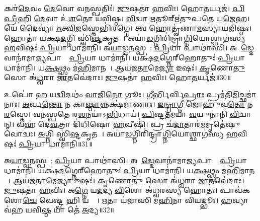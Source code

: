 𑌕𑌰॑\ul{𑌦𑍇}𑌵𑌂 \ul{𑌦𑍇}𑌵𑍋 𑌵\ul{𑌨}𑌸𑍍𑌪𑌤𑌿𑌃॑।
\ul{𑌜𑍁}𑌷𑌤𑌾॑ \ul{𑌹}𑌵𑌿𑌃।
𑌹𑍋\ul{𑌤}𑌰𑍍𑌯𑌜॑।
\ul{𑌪𑌿}\ul{𑌪𑍍𑌰𑍀}𑌹𑌿 \ul{𑌦𑍇}𑌵𑌾 𑌉॑\ul{𑌶}𑌤𑍋 𑌯॑𑌵𑌿𑌷𑍍𑌠।
\ul{𑌵𑌿}𑌦𑍍𑌵𑌾 \ul{𑌋}𑌤𑍂𑌰𑍍\mbox{}𑌋॑𑌤𑍁𑌪𑌤𑍇 𑌯\ul{𑌜𑍇}𑌹।
𑌯𑍇 𑌦𑍈𑌵𑍍𑌯𑌾॑ \ul{𑌋}𑌤𑍍𑌵𑌿\ul{𑌜}𑌸𑍍𑌤𑍇𑌭𑌿॑𑌰𑌗𑍍𑌨𑍇।
𑌤𑍍𑌵 𑌹𑍋𑌤𑍄॑𑌣𑌾\ul{𑌮}𑌸𑍍𑌯𑌾𑌯॑𑌜𑌿𑌷𑍍𑌠𑌃।
𑌹𑍋𑌤𑌾॑ 𑌯𑌕𑍍𑌷\ul{𑌦}𑌗𑍍𑌨𑌿 𑌸𑍍𑌵𑌿॑\ul{𑌷𑍍𑌟}𑌕𑍃𑌤𑌮𑍍᳚।
𑌅𑌯𑌾॑\ul{𑌡}𑌗𑍍𑌨𑌿𑌰𑌿॑𑌨𑍍𑌦𑍍𑌰𑌾\ul{𑌗𑍍𑌨𑌿}𑌯𑍋𑌶𑍍𑌛𑌾𑌗॑𑌸𑍍𑌯 \ul{𑌹}𑌵𑌿𑌷𑌃॑ \ul{𑌪𑍍𑌰𑌿}𑌯𑌾 𑌧𑌾𑌮𑌾॑𑌨𑌿।
𑌅\ul{𑌯𑌾}𑌡𑍍𑌵\ul{𑌨}𑌸𑍍𑌪𑌤𑍇᳚: \ul{𑌪𑍍𑌰𑌿}𑌯𑌾 𑌪𑌾𑌥𑌾॑𑌸𑌿।
𑌅𑌯𑌾᳚\ul{𑌡𑍍𑌦𑍇}𑌵𑌾𑌨𑌾॑𑌮𑌾\ul{𑌜𑍍𑌯}𑌪𑌾𑌨𑌾𑌂᳚ \ul{𑌪𑍍𑌰𑌿}𑌯𑌾 𑌧𑌾𑌮𑌾॑𑌨𑌿।
𑌯𑌕𑍍𑌷॑\ul{𑌦}𑌗𑍍𑌨𑍇𑌰𑍍‌\mbox{}𑌹𑍋𑌤𑍁𑌃॑ \ul{𑌪𑍍𑌰𑌿}𑌯𑌾 𑌧𑌾𑌮𑌾॑𑌨𑌿।
𑌯\ul{𑌕𑍍𑌷}𑌥𑍍𑌸𑍍𑌵𑌂 𑌮॑\ul{𑌹𑌿}𑌮𑌾𑌨𑌮𑍍᳚।
𑌆𑌯॑𑌜\ul{𑌤𑌾}𑌮𑍇\ul{𑌜𑍍𑌯𑌾} 𑌇𑌷𑌃॑।
\ul{𑌕𑍃}𑌣𑍋\ul{𑌤𑍁} 𑌸𑍋 𑌅॑\ul{𑌧𑍍𑌵}𑌰𑌾 \ul{𑌜𑌾}𑌤𑌵𑍇॑𑌦𑌾𑌃।
\ul{𑌜𑍁}𑌷𑌤𑌾॑ \ul{𑌹}𑌵𑌿𑌃।
𑌹𑍋\ul{𑌤}𑌰𑍍𑌯𑌜॑॥30॥

𑌉𑌪𑍋॑ \ul{𑌹} 𑌯\ul{𑌦𑍍𑌵𑌿}𑌦𑌥𑌂॑ \ul{𑌵𑌾}𑌜𑌿\ul{𑌨𑍋} 𑌗𑍂𑌃।
\ul{𑌗𑍀}𑌰𑍍𑌭𑌿𑌰𑍍𑌵𑌿\ul{𑌪𑍍𑌰𑌾𑌃} 𑌪𑍍𑌰𑌮॑𑌤𑌿\ul{𑌮𑌿}𑌚𑍍𑌛𑌮𑌾॑𑌨𑌾𑌃।
\ul{𑌅}𑌰𑍍𑌵\ul{𑌨𑍍𑌤𑍋} 𑌨 𑌕𑌾\ul{𑌷𑍍𑌠𑌾}𑌨𑍍𑌨𑌕𑍍𑌷॑𑌮𑌾𑌣𑌾𑌃।
\ul{𑌇}\ul{𑌨𑍍𑌦𑍍𑌰𑌾}𑌗𑍍𑌨𑍀 𑌜𑍋𑌹𑍁॑𑌵\ul{𑌤𑍋} 𑌨\ul{𑌰}𑌸𑍍𑌤𑍇।
𑌵𑌨॑𑌸𑍍𑌪𑌤𑍇 𑌰\ul{𑌶}𑌨𑌯𑌾॑\-𑌽\ul{𑌭𑌿}𑌧𑌾𑌯॑।
\ul{𑌪𑌿}𑌷𑍍𑌟𑌤॑𑌮𑌯𑌾 \ul{𑌵}𑌯𑍁𑌨𑌾॑𑌨𑌿 \ul{𑌵𑌿}𑌦𑍍𑌵𑌾𑌨𑍍।
𑌵𑌹॑ 𑌦𑍇\ul{𑌵}𑌤𑍍𑌰𑌾 𑌦𑌿॑𑌧𑌿𑌷𑍋 \ul{𑌹}𑌵𑍀𑌷𑌿॑।
𑌪𑍍𑌰 𑌚॑\ul{𑌦𑌾}𑌤𑌾𑌰॑\ul{𑌮}𑌮𑍃𑌤𑍇॑𑌷𑍁 𑌵𑍋𑌚𑌃।
\ul{𑌅}𑌗𑍍𑌨𑌿 𑌸𑍍𑌵𑌿॑\ul{𑌷𑍍𑌟}𑌕𑍃𑌤𑌮𑍍᳚।
𑌅𑌯𑌾॑\ul{𑌡}𑌗𑍍𑌨𑌿𑌰𑌿॑𑌨𑍍𑌦𑍍𑌰𑌾\ul{𑌗𑍍𑌨𑌿}𑌯𑍋𑌶𑍍𑌛𑌾𑌗॑𑌸𑍍𑌯 \ul{𑌹}𑌵𑌿𑌷𑌃॑ \ul{𑌪𑍍𑌰𑌿}𑌯𑌾 𑌧𑌾𑌮𑌾॑𑌨𑌿॥31॥

𑌅\ul{𑌯𑌾}𑌡𑍍𑌵\ul{𑌨}𑌸𑍍𑌪𑌤𑍇᳚: \ul{𑌪𑍍𑌰𑌿}𑌯𑌾 𑌪𑌾𑌥𑌾॑𑌸𑌿।
𑌅𑌯𑌾᳚\ul{𑌡𑍍𑌦𑍇}𑌵𑌾𑌨𑌾॑𑌮𑌾\ul{𑌜𑍍𑌯}𑌪𑌾𑌨𑌾𑌂᳚ \ul{𑌪𑍍𑌰𑌿}𑌯𑌾 𑌧𑌾𑌮𑌾॑𑌨𑌿।
𑌯𑌕𑍍𑌷॑\ul{𑌦}𑌗𑍍𑌨𑍇𑌰𑍍‌\mbox{}𑌹𑍋𑌤𑍁𑌃॑ \ul{𑌪𑍍𑌰𑌿}𑌯𑌾 𑌧𑌾𑌮𑌾॑𑌨𑌿।
𑌯\ul{𑌕𑍍𑌷}𑌥𑍍𑌸𑍍𑌵𑌂 𑌮॑\ul{𑌹𑌿}𑌮𑌾𑌨𑌮𑍍᳚।
𑌆𑌯॑𑌜\ul{𑌤𑌾}𑌮𑍇\ul{𑌜𑍍𑌯𑌾} 𑌇𑌷𑌃॑।
\ul{𑌕𑍃}𑌣𑍋\ul{𑌤𑍁} 𑌸𑍋 𑌅॑\ul{𑌧𑍍𑌵}𑌰𑌾 \ul{𑌜𑌾}𑌤𑌵𑍇॑𑌦𑌾𑌃।
\ul{𑌜𑍁}𑌷𑌤𑌾॑ \ul{𑌹}𑌵𑌿𑌃।
𑌅\ul{𑌗𑍍𑌨𑍇} 𑌯\ul{𑌦}𑌦𑍍𑌯 \ul{𑌵𑌿}𑌶𑍋 𑌅॑𑌧𑍍𑌵𑌰𑌸𑍍𑌯 𑌹𑍋𑌤𑌃।
𑌪𑌾𑌵॑𑌕 𑌶𑍋\ul{𑌚𑍇} 𑌵𑍇𑌷𑍍𑌟𑍍𑌵 𑌹𑌿 𑌯𑌜𑍍𑌵𑌾᳚।
\ul{𑌋}𑌤𑌾 𑌯॑𑌜𑌾𑌸𑌿 𑌮\ul{𑌹𑌿}𑌨𑌾 𑌵𑌿𑌯𑌦𑍍𑌭𑍂𑌃।
\ul{𑌹}𑌵𑍍𑌯𑌾 𑌵॑𑌹 𑌯𑌵𑌿\ul{𑌷𑍍𑌠} 𑌯𑌾 𑌤𑍇॑ \ul{𑌅}𑌦𑍍𑌯॥32॥\anuvakamend[𑌧𑌾𑌮𑌾॑\ul{𑌨𑌿} 𑌭𑍂𑌰𑍇𑌕𑌂॑ 𑌚]


